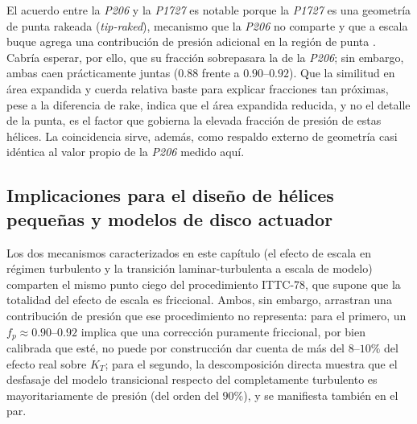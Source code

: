 El acuerdo entre la \textit{P206} y la \textit{P1727} es notable porque la \textit{P1727} es una geometría de punta
rakeada (\emph{tip-raked}), mecanismo que la \textit{P206} no comparte y que a escala buque agrega
una contribución de presión adicional en la región de punta
\citep{Baltazar2021, gallotti2026}. Cabría esperar, por ello, que su fracción sobrepasara
la de la \textit{P206}; sin embargo, ambas caen prácticamente juntas ($0.88$ frente a
$0.90$--$0.92$). Que la similitud en área expandida y cuerda relativa baste para explicar
fracciones tan próximas, pese a la diferencia de rake, indica que el área expandida
reducida, y no el detalle de la punta, es el factor que gobierna la elevada fracción de
presión de estas hélices. La coincidencia sirve, además, como respaldo externo de
geometría casi idéntica al valor propio de la \textit{P206} medido aquí.

\subsection{Implicaciones para el diseño de hélices pequeñas y modelos de disco
actuador}
\label{sec:coreana_implicaciones}

Los dos mecanismos caracterizados en este capítulo (el efecto de escala en régimen turbulento y la transición laminar-turbulenta a escala de modelo) comparten
el mismo punto ciego del procedimiento ITTC-78, que supone que la totalidad del efecto de
escala es friccional. Ambos, sin embargo, arrastran una contribución de presión que ese
procedimiento no representa: para el primero, un $f_p\approx0.90$--$0.92$ implica que una
corrección puramente friccional, por bien calibrada que esté, no puede por construcción dar
cuenta de más del $8$--$10\%$ del efecto real sobre $K_T$; para el segundo, la
descomposición directa muestra que el desfasaje del modelo transicional respecto del
completamente turbulento es mayoritariamente de presión (del orden del $90\%$), y se
manifiesta también en el par.

